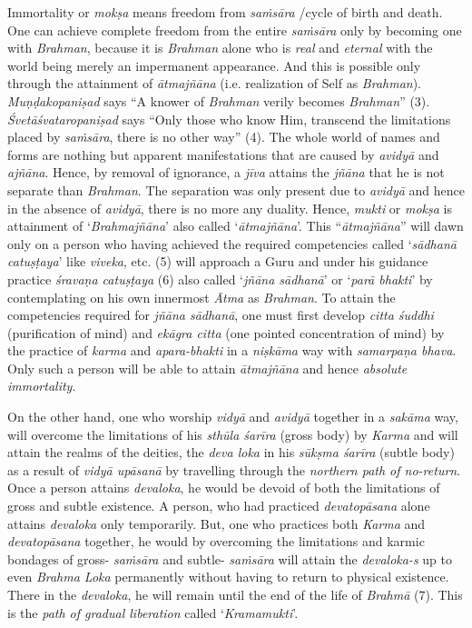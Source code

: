 Immortality or \emph{mokṣa} means freedom from \emph{saṁsāra} /cycle of birth and death. One can achieve complete freedom from the entire \emph{saṁsāra} only by becoming one with \emph{Brahman}, because it is \emph{Brahman} alone who is \emph{real} and \emph{eternal} with the world being merely an impermanent appearance. And this is possible only through the attainment of \emph{ātmajñāna} (i.e. realization of Self as \emph{Brahman}). \emph{Muṇḍakopaniṣad} says ``A knower of \emph{Brahman} verily becomes \emph{Brahman}'' (3). \emph{Śvetāśvataropaniṣad} says ``Only those who know Him, transcend the limitations placed by \emph{saṁsāra}, there is no other way'' (4). The whole world of names and forms are nothing but apparent manifestations that are caused by \emph{avidyā} and \emph{ajñāna}. Hence, by removal of ignorance, a \emph{jīva} attains the \emph{jñāna} that he is not separate than \emph{Brahman}. The separation was only present due to \emph{avidyā} and hence in the absence of \emph{avidyā}, there is no more any duality. Hence, \emph{mukti} or \emph{mokṣa} is attainment of `\emph{Brahmajñāna}' also called `\emph{ātmajñāna}'. This ``\emph{ātmajñāna}'' will dawn only on a person who having achieved the required competencies called `\emph{sādhanā catuṣṭaya}' like \emph{viveka}, etc. (5) will approach a Guru and under his guidance practice \emph{śravaṇa catuṣṭaya} (6) also called `\emph{jñāna sādhanā}' or `\emph{parā bhakti}' by contemplating on his own innermost \emph{Ātma} as \emph{Brahman}. To attain the competencies required for \emph{jñāna sādhanā}, one must first develop \emph{citta śuddhi} (purification of mind) and \emph{ekāgra citta} (one pointed concentration of mind) by the practice of \emph{karma} and \emph{apara-bhakti} in a \emph{niṣkāma} way with \emph{samarpaṇa bhava}. Only such a person will be able to attain \emph{ātmajñāna} and hence \emph{absolute immortality}.

On the other hand, one who worship \emph{vidyā} and \emph{avidyā} together in a \emph{sakāma} way, will overcome the limitations of his \emph{sthūla śarīra} (gross body) by \emph{Karma} and will attain the realms of the deities, the \emph{deva loka} in his \emph{sūkṣma śarīra} (subtle body) as a result of \emph{vidyā upāsanā} by travelling through the \emph{northern path of no-return}. Once a person attains \emph{devaloka}, he would be devoid of both the limitations of gross and subtle existence. A person, who had practiced \emph{devatopāsana} alone attains \emph{devaloka} only temporarily. But, one who practices both \emph{Karma} and \emph{devatopāsana} together, he would by overcoming the limitations and karmic bondages of gross- \emph{saṁsāra} and subtle- \emph{saṁsāra} will attain the \emph{devaloka-s} up to even \emph{Brahma Loka} permanently without having to return to physical existence. There in the \emph{devaloka}, he will remain until the end of the life of \emph{Brahmā} (7). This is the \emph{path of gradual liberation} called `\emph{Kramamukti}'.

